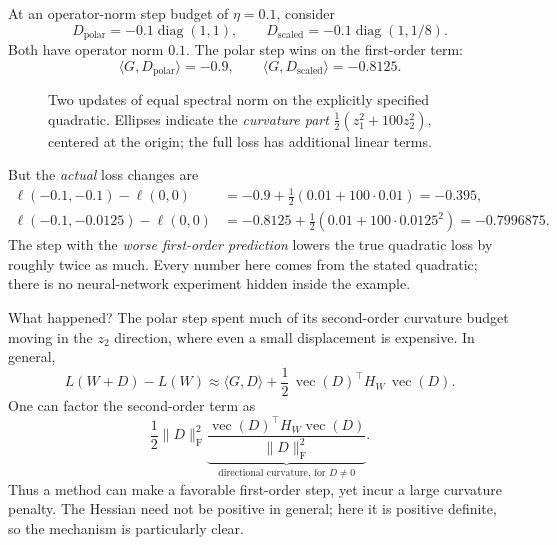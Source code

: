 At an operator-norm step budget of \(\eta=0.1\), consider
\[
 D_{\mathrm{polar}}=-0.1\operatorname{diag}(1,1),
 \qquad
 D_{\mathrm{scaled}}=-0.1\operatorname{diag}(1,1/8).
\]
Both have operator norm \(0.1\).  The polar step wins on the first-order term:
\[
 \langle G,D_{\mathrm{polar}}\rangle=-0.9,\qquad
 \langle G,D_{\mathrm{scaled}}\rangle=-0.8125.
\]

\begin{figure}[H]
\centering
{}
\caption{Two updates of equal spectral norm on the explicitly specified quadratic.  Ellipses indicate the \emph{curvature part} \(\frac12(z_1^2+100z_2^2)\), centered at the origin; the full loss has additional linear terms.}
\label{fig:N20261017-curvature-counterexample}
\end{figure}
But the \emph{actual} loss changes are
\begin{align*}
 \ell(-0.1,-0.1)-\ell(0,0)
 &= -0.9+\frac12(0.01+100\cdot0.01)
 =-0.395,\\
 \ell(-0.1,-0.0125)-\ell(0,0)
 &= -0.8125+\frac12(0.01+100\cdot0.0125^2)
 =-0.7996875.
\end{align*}
The step with the \emph{worse first-order prediction} lowers the true quadratic loss by roughly twice as much.  Every number here comes from the stated quadratic; there is no neural-network experiment hidden inside the example.

What happened?  The polar step spent much of its second-order curvature budget moving in the \(z_2\) direction, where even a small displacement is expensive.  In general,
\begin{equation}
 L(W+D)-L(W)
 \approx \langle G,D\rangle+
 \frac12\,\operatorname{vec}(D)^\top
 H_W\,\operatorname{vec}(D).
 \label{eq:N20261017-curvature-balance}
\end{equation}
One can factor the second-order term as
\[
 \frac12\|D\|_{\mathrm F}^2
 \underbrace{\frac{\operatorname{vec}(D)^\top
 H_W\operatorname{vec}(D)}{\|D\|_{\mathrm F}^2}}_
 {\text{directional curvature, for }D\ne0}.
\]
Thus a method can make a favorable first-order step, yet incur a large curvature penalty.  The Hessian need not be positive in general; here it is positive definite, so the mechanism is particularly clear.



